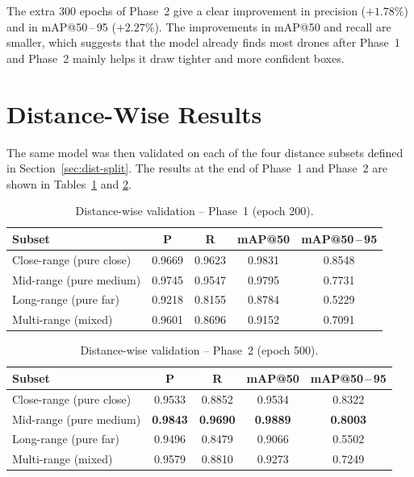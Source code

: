 \documentclass[12pt,a4paper]{report}
\begin{document}
The extra 300 epochs of Phase~2 give a clear improvement in precision
($+1.78\%$) and in mAP@50\,--\,95 ($+2.27\%$). The improvements in mAP@50 and
recall are smaller, which suggests that the model already finds most drones
after Phase~1 and Phase~2 mainly helps it draw tighter and more confident boxes.

\section{Distance-Wise Results}
\label{sec:dist-results}

The same model was then validated on each of the four distance subsets defined
in Section~\ref{sec:dist-split}. The results at the end of Phase~1 and Phase~2
are shown in Tables~\ref{tab:dist-phase1} and \ref{tab:dist-phase2}.

\begin{table}[H]
\centering
\caption{Distance-wise validation -- Phase~1 (epoch 200).}
\label{tab:dist-phase1}
\begin{tabular}{lcccc}
\toprule
\textbf{Subset}           & \textbf{P} & \textbf{R} & \textbf{mAP@50} & \textbf{mAP@50\,--\,95} \\
\midrule
Close-range  (pure close) & 0.9669 & 0.9623 & 0.9831 & 0.8548 \\
Mid-range    (pure medium)& 0.9745 & 0.9547 & 0.9795 & 0.7731 \\
Long-range   (pure far)   & 0.9218 & 0.8155 & 0.8784 & 0.5229 \\
Multi-range  (mixed)      & 0.9601 & 0.8696 & 0.9152 & 0.7091 \\
\bottomrule
\end{tabular}
\end{table}

\begin{table}[H]
\centering
\caption{Distance-wise validation -- Phase~2 (epoch 500).}
\label{tab:dist-phase2}
\begin{tabular}{lcccc}
\toprule
\textbf{Subset}           & \textbf{P} & \textbf{R} & \textbf{mAP@50} & \textbf{mAP@50\,--\,95} \\
\midrule
Close-range  (pure close) & 0.9533 & 0.8852 & 0.9534 & 0.8322 \\
Mid-range    (pure medium)& \textbf{0.9843} & \textbf{0.9690} & \textbf{0.9889} & \textbf{0.8003} \\
Long-range   (pure far)   & 0.9496 & 0.8479 & 0.9066 & 0.5502 \\
Multi-range  (mixed)      & 0.9579 & 0.8810 & 0.9273 & 0.7249 \\
\bottomrule
\end{tabular}
\end{table}
\end{document}
